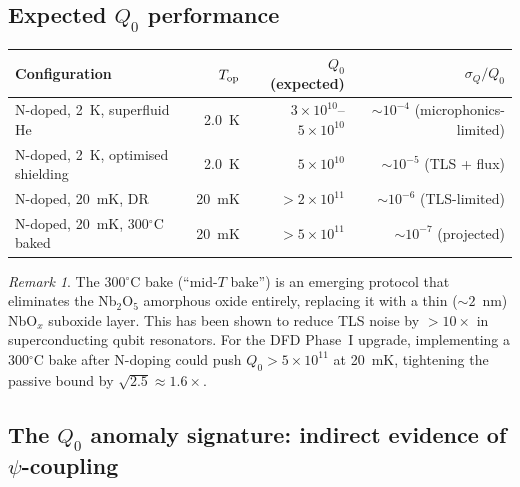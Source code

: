 \documentclass[11pt]{article}
\theoremstyle{definition}
\theoremstyle{remark}
\newtheorem{remark}[theorem]{Remark}
\newcommand{\ee}[1]{\times 10^{#1}}
\begin{document}
\subsection{Expected $Q_0$ performance}

\begin{center}
\renewcommand{\arraystretch}{1.3}
\begin{tabular}{lrrr}
\toprule
Configuration & $T_{\rm op}$ & $Q_0$ (expected) & $\sigma_Q/Q_0$ \\
\midrule
N-doped, 2~K, superfluid He & 2.0~K & $3\ee{10}$--$5\ee{10}$ &
  $\sim 10^{-4}$ (microphonics-limited) \\
N-doped, 2~K, optimised shielding & 2.0~K & $5\ee{10}$ &
  $\sim 10^{-5}$ (TLS + flux) \\
N-doped, 20~mK, DR & 20~mK & $>2\ee{11}$ &
  $\sim 10^{-6}$ (TLS-limited) \\
N-doped, 20~mK, 300$^\circ$C baked & 20~mK & $>5\ee{11}$ &
  $\sim 10^{-7}$ (projected) \\
\bottomrule
\end{tabular}
\end{center}

\begin{remark}
The 300$^\circ$C bake (``mid-$T$ bake'') is an emerging protocol that
eliminates the Nb$_2$O$_5$ amorphous oxide entirely, replacing it with
a thin ($\sim 2$~nm) NbO$_x$ suboxide layer. This has been shown to
reduce TLS noise by $>10\times$ in superconducting qubit resonators.
For the DFD Phase~I upgrade, implementing a 300$^\circ$C bake after
N-doping could push $Q_0 > 5\ee{11}$ at 20~mK, tightening the passive
bound by $\sqrt{2.5}\approx 1.6\times$.
\end{remark}

\subsection{The $Q_0$ anomaly signature: indirect evidence of $\psi$-coupling}
\label{sec:q0_anomaly}
\end{document}
